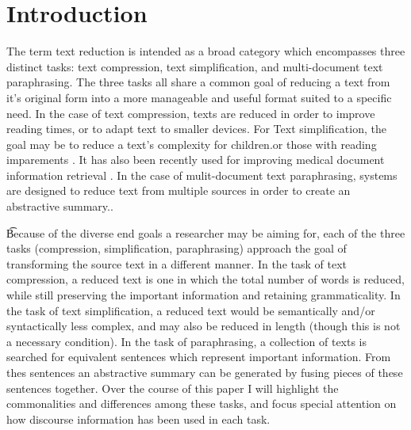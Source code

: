 \section{Introduction}

\iffalse
{Talk about what the three different categories are, and how they can be differentiated from each other.  (this should be about 2 paragraphs).  
Then talk about what commonalities each category has with the others(this can be again 1-2 paragraphs) }
\fi

{The term text reduction is intended as a broad category which encompasses three distinct tasks: text compression, text simplification, and multi-document text paraphrasing.  The three tasks all share a common goal of reducing a text from it's original form into a more manageable and useful format suited to a specific need.   In the case of text compression, texts are reduced in order to improve reading times,\citet{bla} or to adapt text to smaller devices\citet{bla}. For Text simplification, the goal may be to reduce a text's complexity for children\citet{bla}.or those with reading imparements \citet{bla}.  It has also been recently used for improving medical document information retrieval \citet{bla}. In the case of mulit-document text paraphrasing,  systems are  designed to reduce text from multiple sources in order to create an abstractive summary.\citet{bla}.}

\t{Because of the diverse end goals a researcher may be aiming for, each of the three tasks (compression, simplification, paraphrasing) approach the goal of transforming the source text in a different manner. In the task of text compression, a reduced text is one in which the total number of words is reduced, while still preserving the important information and retaining grammaticality.  In the task of text simplification, a reduced text would be semantically and/or syntactically less complex, and may also be reduced in length (though this is not a necessary condition).  In the task of paraphrasing, a collection of texts is searched for equivalent sentences which represent important information. From thes sentences an abstractive summary can be generated by fusing pieces of these sentences together.
Over the course of this paper I will highlight the commonalities and differences among these tasks, and focus special attention on how discourse information has been used in each task.}








